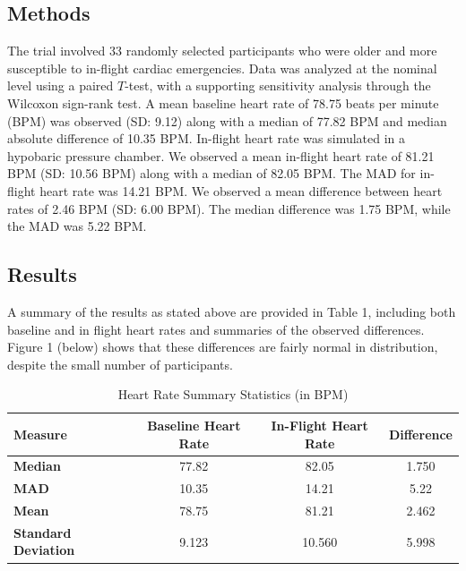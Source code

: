 \documentclass{article}
\begin{document}
\begin{enumerate}
		\subsection*{Methods}

		The trial involved 33 randomly selected participants who were older and more susceptible to in-flight cardiac emergencies. Data was analyzed at the nominal level using a paired $T$-test, with a supporting sensitivity analysis through the Wilcoxon sign-rank test. A mean baseline heart rate of 78.75 beats per minute (BPM) was observed (SD: 9.12) along with a median of 77.82 BPM and median absolute difference of 10.35 BPM. In-flight heart rate was simulated in a hypobaric pressure chamber. We observed a mean in-flight heart rate of 81.21 BPM (SD: 10.56 BPM) along with a median of 82.05 BPM. The MAD for in-flight heart rate was 14.21 BPM. We observed a mean difference between heart rates of 2.46 BPM (SD: 6.00 BPM). The median difference was 1.75 BPM, while the MAD was 5.22 BPM.

		\subsection*{Results}

		A summary of the results as stated above are provided in Table 1, including both baseline and in flight heart rates and summaries of the observed differences. Figure 1 (below) shows that these differences are fairly normal in distribution, despite the small number of participants.

		\begin{table}[h!]
			\centering
			\footnotesize
			\caption{Heart Rate Summary Statistics (in BPM)}
			\label{tab:heart_rate_summary}
			\begin{tabular}{lccc}
			\toprule
			\textbf{Measure}         & \textbf{Baseline Heart Rate} & \textbf{In-Flight Heart Rate} & \textbf{Difference} \\ 
			\midrule
			\textbf{Median}          & 77.82                        & 82.05                         & 1.750               \\ 
			\textbf{MAD}             & 10.35                        & 14.21                         & 5.22                \\ 
			\textbf{Mean}            & 78.75                        & 81.21                         & 2.462               \\ 
			\textbf{Standard Deviation} & 9.123                      & 10.560                        & 5.998               \\ 
			\bottomrule
			\end{tabular}
		\end{table}


\end{enumerate}
\end{document}
